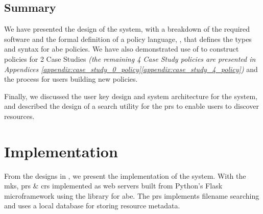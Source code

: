 \documentclass[british,table,svgnames,xcdraw]{l4proj}
\begin{document}




\section{Summary}
\label{sec:design_summary}

We have presented the design of the \theResServer system, with a breakdown of the required software and the formal definition of a policy language, \thePolicyLang, that defines the types and syntax for \acrfull{abe} policies. We have also demonstrated use of \thePolicyLang to construct policies for 2 Case Studies \textit{(the remaining 4 Case Study policies are presented in Appendices \ref{appendix:case_study_0_policy}\textemdash\ref{appendix:case_study_4_policy})} and the process for users building new policies.

Finally, we discussed the user key design and system architecture for the \theResServer system, and described the design of a search utility for the \acrfull{prs} to enable users to discover resources.

\chapter{Implementation}
\label{ch:implementation}

From the designs in , we present the implementation of the \theResServer system. With the \acrfull{mks}, \acrfull{prs} \& \acrfull{crs} implemented as web servers built from Python's Flask microframework using the \PyOpenABE library for \acrfull{abe}. The \acrshort{prs} implements filename searching and uses a local database for storing resource metadata.











\end{document}
